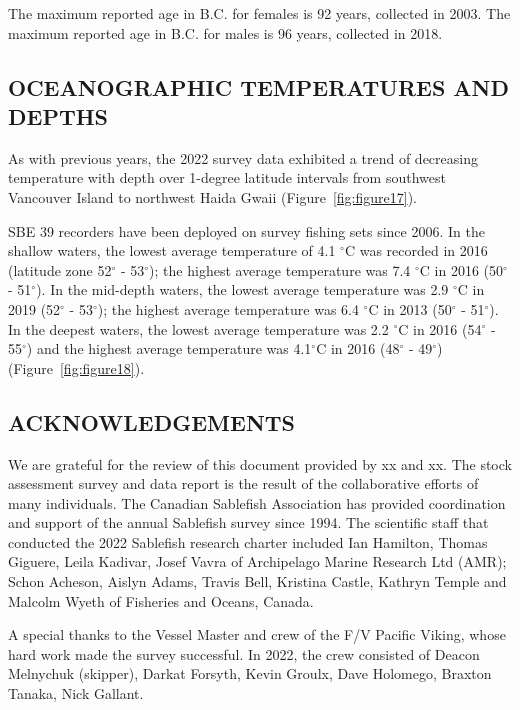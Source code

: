 \documentclass[12pt]{article}\usepackage[]{graphicx}\usepackage[]{color}
\begin{document}
The maximum reported age in B.C. for females is 92 years, collected in 2003. The maximum reported age in B.C. for males is 96 years, collected in 2018.

\hypertarget{oceanographic-temperatures-and-depths}{%
\subsection{OCEANOGRAPHIC TEMPERATURES AND DEPTHS}\label{oceanographic-temperatures-and-depths}}

As with previous years, the 2022 survey data exhibited a trend of decreasing temperature with depth over 1-degree latitude intervals from southwest Vancouver Island to northwest Haida Gwaii (Figure~\ref{fig:figure17}).

SBE 39 recorders have been deployed on survey fishing sets since 2006. In the shallow waters, the lowest average temperature of 4.1 \(^\circ\)C was recorded in 2016 (latitude zone 52\(^\circ\) - 53\(^\circ\)); the highest average temperature was 7.4 \(^\circ\)C in 2016 (50\(^\circ\) - 51\(^\circ\)). In the mid-depth waters, the lowest average temperature was 2.9 \(^\circ\)C in 2019 (52\(^\circ\) - 53\(^\circ\)); the highest average temperature was 6.4 \(^\circ\)C in 2013 (50\(^\circ\) - 51\(^\circ\)). In the deepest waters, the lowest average temperature was 2.2 \(^\circ\)C in 2016 (54\(^\circ\) - 55\(^\circ\)) and the highest average temperature was 4.1\(^\circ\)C in 2016 (48\(^\circ\) - 49\(^\circ\)) (Figure~\ref{fig:figure18}).

\hypertarget{acknowledgements}{%
\subsection{ACKNOWLEDGEMENTS}\label{acknowledgements}}

We are grateful for the review of this document provided by xx and xx. The stock assessment survey and data report is the result of the collaborative efforts of many individuals. The Canadian Sablefish Association has provided coordination and support of the annual Sablefish survey since 1994. The scientific staff that conducted the 2022 Sablefish research charter included Ian Hamilton, Thomas Giguere, Leila Kadivar, Josef Vavra of Archipelago Marine Research Ltd (AMR); Schon Acheson, Aislyn Adams, Travis Bell, Kristina Castle, Kathryn Temple and Malcolm Wyeth of Fisheries and Oceans, Canada.

A special thanks to the Vessel Master and crew of the F/V Pacific Viking, whose hard work made the survey successful. In 2022, the crew consisted of Deacon Melnychuk (skipper), Darkat Forsyth, Kevin Groulx, Dave Holomego, Braxton Tanaka, Nick Gallant.
\end{document}
